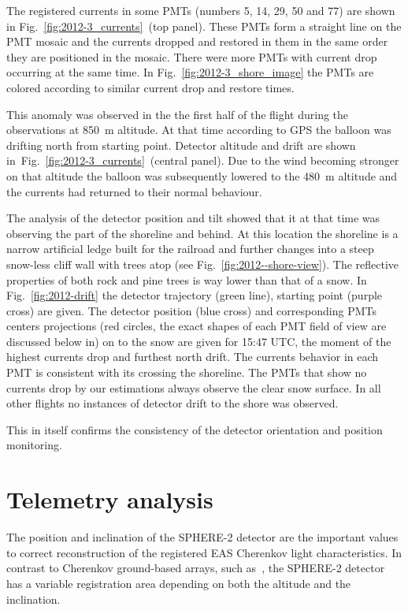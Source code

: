 \documentclass[final,5p,times,twocolumn]{elsarticle}
\begin{document}
The registered currents in some PMTs (numbers 5, 14, 29, 50 and 77) are shown in Fig.~\ref{fig:2012-3_currents}~(top panel). These PMTs form a straight line on the PMT mosaic and the currents dropped and restored in them in the same order they are positioned in the mosaic. There were more PMTs with current drop occurring at the same time. In Fig.~\ref{fig:2012-3_shore_image} the PMTs are colored according to similar current drop and restore times.

This anomaly was observed in the the first half of the flight during the observations at 850~m altitude. At that time according to GPS the balloon was drifting north from starting point. Detector altitude and drift are shown in~Fig.~\ref{fig:2012-3_currents}~(central panel). Due to the wind becoming stronger on that altitude the balloon was subsequently lowered to the 480~m altitude and the currents had returned to their normal behaviour. 

The analysis of the detector position and tilt showed that it at that time was observing the part of the shoreline and behind. At this location the shoreline is a narrow artificial ledge built for the railroad and further changes into a steep snow-less cliff wall with trees atop (see Fig.~\ref{fig:2012--shore-view}). The reflective properties of both rock and pine trees is way lower than that of a snow. In Fig.~\ref{fig:2012-drift} the detector trajectory (green line), starting point (purple cross) are given. The detector position (blue cross) and corresponding PMTs centers projections (red circles, the exact shapes of each PMT field of view are discussed below in) on to the snow are given for 15:47 UTC, the moment of the highest currents drop and furthest north drift. The currents behavior in each PMT is consistent with its crossing the shoreline. The PMTs that show no currents drop by our estimations always observe the clear snow surface. In all other flights no instances of detector drift to the shore was observed.

This in itself confirms the consistency of the detector orientation and position monitoring.

\section{Telemetry analysis}

The position and inclination of the SPHERE-2 detector are the important values to correct reconstruction of the registered EAS Cherenkov light characteristics. In contrast to Cherenkov ground-based arrays, such as~\cite{Yakutsk19,TUNKA133}, the SPHERE-2 detector has a variable registration area depending on both the altitude and the inclination.
\end{document}
